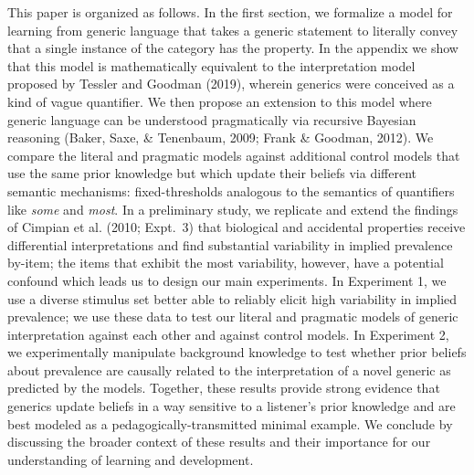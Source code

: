 \documentclass[floatsintext,doc]{apa6}
\begin{document}
This paper is organized as follows.
In the first section, we formalize a model for learning from generic language that takes a generic statement to literally convey that a single instance of the category has the property.
In the appendix we show that this model is mathematically equivalent to the interpretation model proposed by Tessler and Goodman (2019), wherein generics were conceived as a kind of vague quantifier.
We then propose an extension to this model where generic language can be understood pragmatically via recursive Bayesian reasoning (Baker, Saxe, \& Tenenbaum, 2009; Frank \& Goodman, 2012).
We compare the literal and pragmatic models against additional control models that use the same prior knowledge but which update their beliefs via different semantic mechanisms: fixed-thresholds analogous to the semantics of quantifiers like \emph{some} and \emph{most}.
In a preliminary study, we replicate and extend the findings of Cimpian et al. (2010; Expt.~3) that biological and accidental properties receive differential interpretations and find substantial variability in implied prevalence by-item; the items that exhibit the most variability, however, have a potential confound which leads us to design our main experiments.
In Experiment 1, we use a diverse stimulus set better able to reliably elicit high variability in implied prevalence; we use these data to test our literal and pragmatic models of generic interpretation against each other and against control models.
In Experiment 2, we experimentally manipulate background knowledge to test whether prior beliefs about prevalence are causally related to the interpretation of a novel generic as predicted by the models.
Together, these results provide strong evidence that generics update beliefs in a way sensitive to a listener's prior knowledge and are best modeled as a pedagogically-transmitted minimal example.
We conclude by discussing the broader context of these results and their importance for our understanding of learning and development.
\end{document}
